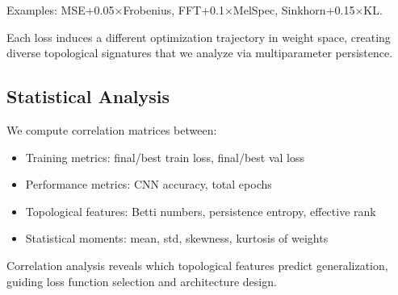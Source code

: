 Examples: MSE+0.05×Frobenius, FFT+0.1×MelSpec, Sinkhorn+0.15×KL.

Each loss induces a different optimization trajectory in weight space, creating diverse topological signatures that we analyze via multiparameter persistence.

\subsection{Statistical Analysis}

We compute correlation matrices between:
\begin{itemize}
    \item Training metrics: final/best train loss, final/best val loss
    \item Performance metrics: CNN accuracy, total epochs
    \item Topological features: Betti numbers, persistence entropy, effective rank
    \item Statistical moments: mean, std, skewness, kurtosis of weights
\end{itemize}

Correlation analysis reveals which topological features predict generalization, guiding loss function selection and architecture design.
